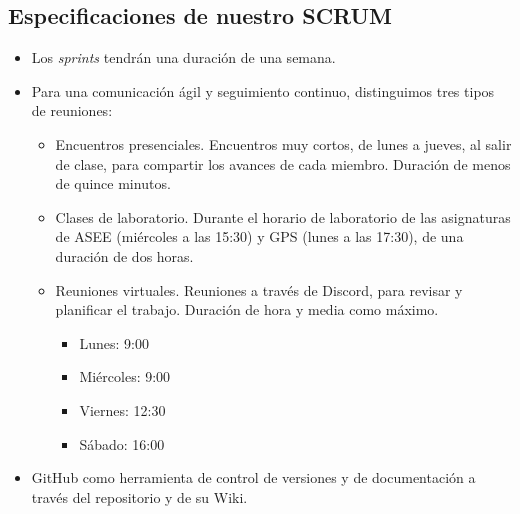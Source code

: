 \documentclass[../main.tex]{subfiles}
\begin{document}
\subsection{Especificaciones de nuestro SCRUM}

\begin{itemize}
    \item Los \textit{sprints} tendrán una duración de una semana.
    \item Para una comunicación ágil y seguimiento continuo, distinguimos tres tipos de reuniones:
    \begin{itemize}
        \item Encuentros presenciales. Encuentros muy cortos, de lunes a jueves, al salir de clase, para compartir los avances de cada miembro. Duración de menos de quince minutos.
        \item Clases de laboratorio. Durante el horario de laboratorio de las asignaturas de ASEE (miércoles a las 15:30) y GPS (lunes a las 17:30), de una duración de dos horas.
        \item Reuniones virtuales. Reuniones a través de Discord, para revisar y planificar el trabajo. Duración de hora y media como máximo.
        \begin{itemize}
            \item Lunes: 9:00
            \item Miércoles: 9:00
            \item Viernes: 12:30 
            \item Sábado: 16:00 
        \end{itemize}
    \end{itemize}
    \item GitHub como herramienta de control de versiones y de documentación a través del repositorio y de su Wiki.
\end{itemize}
\end{document}
